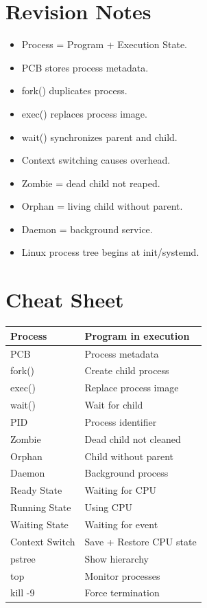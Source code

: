 \section{Revision Notes}

\begin{itemize}
\item Process = Program + Execution State.
\item PCB stores process metadata.
\item fork() duplicates process.
\item exec() replaces process image.
\item wait() synchronizes parent and child.
\item Context switching causes overhead.
\item Zombie = dead child not reaped.
\item Orphan = living child without parent.
\item Daemon = background service.
\item Linux process tree begins at init/systemd.
\end{itemize}

\section{Cheat Sheet}

\begin{center}
\begin{tabular}{|p{5cm}|p{8cm}|}
\hline
Process & Program in execution \\
\hline
PCB & Process metadata \\
\hline
fork() & Create child process \\
\hline
exec() & Replace process image \\
\hline
wait() & Wait for child \\
\hline
PID & Process identifier \\
\hline
Zombie & Dead child not cleaned \\
\hline
Orphan & Child without parent \\
\hline
Daemon & Background process \\
\hline
Ready State & Waiting for CPU \\
\hline
Running State & Using CPU \\
\hline
Waiting State & Waiting for event \\
\hline
Context Switch & Save + Restore CPU state \\
\hline
pstree & Show hierarchy \\
\hline
top & Monitor processes \\
\hline
kill -9 & Force termination \\
\hline
\end{tabular}
\end{center}